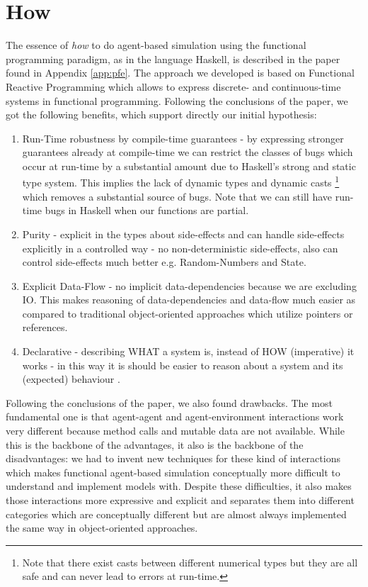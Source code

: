 \section{How}
\label{sect:how}
The essence of \textit{how} to do agent-based simulation using the functional programming paradigm, as in the language Haskell, is described in the paper found in Appendix \ref{app:pfe}. The approach we developed is based on Functional Reactive Programming which allows to express discrete- and continuous-time systems in functional programming. Following the conclusions of the paper, we got the following benefits, which support directly our initial hypothesis:
\begin{enumerate}
	\item Run-Time robustness by compile-time guarantees - by expressing stronger guarantees already at compile-time we can restrict the classes of bugs which occur at run-time by a substantial amount due to Haskell's strong and static type system.  This implies the lack of dynamic types and dynamic casts \footnote{Note that there exist casts between different numerical types but they are all safe and can never lead to errors at run-time.} which removes a substantial source of bugs.  Note that we can still have run-time bugs in Haskell when our functions are partial.
	\item Purity - explicit in the types about side-effects and can handle side-effects explicitly in a controlled way - no non-deterministic side-effects, also can control side-effects much better e.g. Random-Numbers and State.
	\item Explicit Data-Flow - no implicit data-dependencies because we are excluding IO. This makes reasoning of data-dependencies and data-flow much easier as compared to traditional object-oriented approaches which utilize pointers or references.
	\item Declarative - describing WHAT a system is, instead of HOW (imperative) it works - in this way it is should be easier to reason about a system and its (expected) behaviour .
\end{enumerate}

Following the conclusions of the paper, we also found drawbacks. The most fundamental one is that agent-agent and agent-environment interactions work very different because method calls and mutable data are not available. While this is the backbone of the advantages, it also is the backbone of the disadvantages: we had to invent new techniques for these kind of interactions which makes functional agent-based simulation conceptually more difficult to understand and implement models with. Despite these difficulties, it also makes those interactions more expressive and explicit and separates them into different categories which are conceptually different but are almost always implemented the same way in object-oriented approaches.

